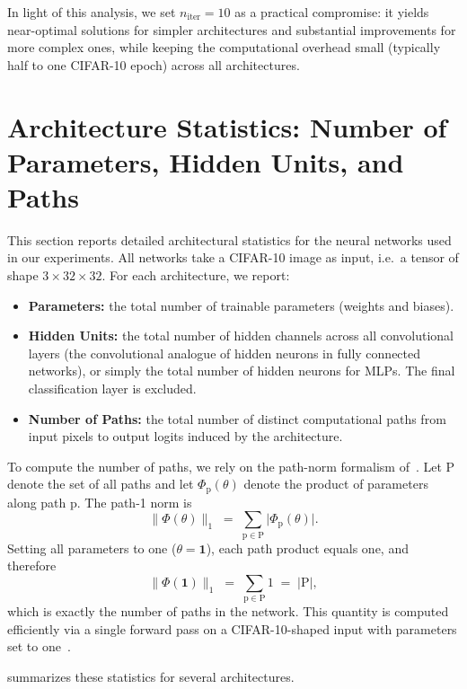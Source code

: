 \documentclass{article}
\theoremstyle{plain}
\theoremstyle{definition}
\theoremstyle{remark}
\def\path{{\mathrm{p}}}
\def\pathset{{\mathrm{P}}}
\begin{document}
In light of this analysis, we set $n_{\text{iter}} = 10$ as a practical compromise: it yields near-optimal solutions for simpler architectures and substantial improvements for more complex ones, while keeping the computational overhead small (typically half to one CIFAR-10 epoch) across all architectures. 



\section{Architecture Statistics: Number of Parameters, Hidden Units, and Paths}
\label{sec:arch_stats}

This section reports detailed architectural statistics for the neural networks used in our
experiments.
All networks take a CIFAR-10 image as input, i.e.\ a tensor of shape $3 \times 32 \times 32$. For each architecture, we report:

\begin{itemize}
    \item \textbf{Parameters:} the total number of trainable parameters (weights and biases).
    \item \textbf{Hidden Units:} the total number of hidden channels across all convolutional layers (the convolutional analogue of hidden neurons in fully connected networks), or simply the total number of hidden neurons for MLPs. The final classification layer is excluded.
    \item \textbf{Number of Paths:} the total number of distinct computational paths from input pixels to output logits induced by the architecture.
\end{itemize}

To compute the number of paths, we rely on the path-norm formalism of~\citet{gonon2023path}.
Let $\pathset$ denote the set of all paths and let $\Phi_\path(\theta)$ denote the product of parameters along path $\path$. The path-1 norm is
\[
\|\Phi(\theta)\|_1 \;=\; \sum_{\path \in \pathset} \big| \Phi_\path(\theta) \big|.
\]
Setting all parameters to one ($\theta = \mathbf{1}$), each path product equals one, and therefore
\[
\|\Phi(\mathbf{1})\|_1 \;=\; \sum_{\path \in \pathset} 1 \;=\; |\pathset|,
\]
which is exactly the number of paths in the network. This quantity is computed efficiently via a single forward pass on a CIFAR-10-shaped input with parameters set to one~\citep{gonon2023path}.

 summarizes these statistics for several architectures.
\end{document}
